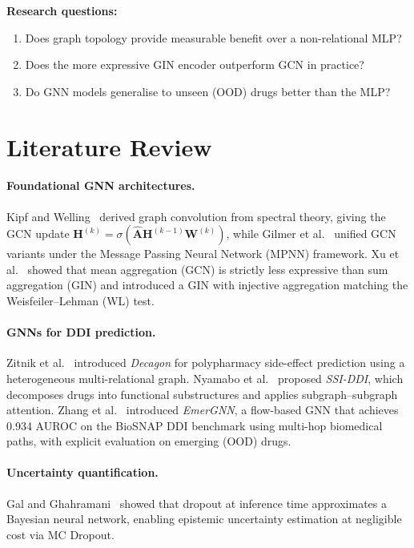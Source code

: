 \documentclass[10pt,twocolumn]{article}
\begin{document}
\noindent\textbf{Research questions:}
\begin{enumerate}[leftmargin=*,noitemsep,topsep=1pt]
  \item Does graph topology provide measurable benefit over a non-relational MLP?
  \item Does the more expressive GIN encoder outperform GCN in practice?
  \item Do GNN models generalise to unseen (OOD) drugs better than the MLP?
\end{enumerate}

\section{Literature Review}

\paragraph{Foundational GNN architectures.}
Kipf and Welling~\cite{kipf2017} derived graph convolution from spectral theory,
giving the GCN update
$\mathbf{H}^{(k)}{=}\sigma(\hat{\mathbf{A}}\mathbf{H}^{(k-1)}\mathbf{W}^{(k)})$,
while Gilmer et al.~\cite{gilmer2017} unified GCN variants under the
Message Passing Neural Network (MPNN) framework.
Xu et al.~\cite{xu2019} showed that mean aggregation (GCN) is strictly less
expressive than sum aggregation (GIN) and introduced a GIN with injective
aggregation matching the Weisfeiler–Lehman (WL) test.

\paragraph{GNNs for DDI prediction.}
Zitnik et al.~\cite{zitnik2018} introduced \emph{Decagon} for polypharmacy
side-effect prediction using a heterogeneous multi-relational graph.
Nyamabo et al.~\cite{nyamabo2021} proposed \emph{SSI-DDI}, which decomposes
drugs into functional substructures and applies subgraph–subgraph attention.
Zhang et al.~\cite{zhang2023} introduced \emph{EmerGNN}, a flow-based GNN that
achieves 0.934 AUROC on the BioSNAP DDI benchmark using multi-hop biomedical
paths, with explicit evaluation on emerging (OOD) drugs.

\paragraph{Uncertainty quantification.}
Gal and Ghahramani~\cite{gal2016} showed that dropout at inference time
approximates a Bayesian neural network, enabling epistemic uncertainty estimation
at negligible cost via MC Dropout.
\end{document}

